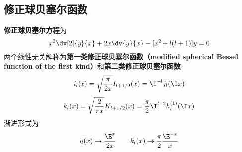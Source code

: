 \subsection{修正球贝塞尔函数}

\textbf{修正球贝塞尔方程}为
\begin{equation}
x^2 \dv[2]{y}{x} + 2x\dv{y}{x} - [x^2 + l(l + 1)]y = 0
\end{equation}
两个线性无关解称为\textbf{第一类修正球贝塞尔函数（modified spherical Bessel function of the first kind）}和\textbf{第二类修正球贝塞尔函数}
\begin{equation}
i_l(x) = \sqrt{\frac{\pi }{2x}} I_{l+1/2}(x) = \I^{-l} j_l(\I x)
\end{equation}
\begin{equation}\label{SphBsl_eq1}
k_l(x) = \sqrt{\frac{2}{\pi x}} K_{l+1/2}(x) = \frac{\pi }{2} \I^{l + 2} h_l^{(1)}(\I x)
\end{equation}
渐进形式为
\begin{equation}
i_l(x) \to \frac{\E^x}{2x}
\qquad
k_l(x) \to \frac{\pi}{2} \frac{\E^{-x}}{x}
\end{equation}
